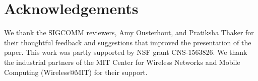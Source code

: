 \section*{Acknowledgements}

We thank the SIGCOMM reviewers, Amy Ousterhout, and Pratiksha Thaker for their
thoughtful feedback and suggestions that improved the presentation of the
paper. This work was partly supported by NSF grant CNS-1563826. We thank the
industrial partners of the MIT Center for Wireless Networks and Mobile
Computing (Wireless@MIT) for their support.
